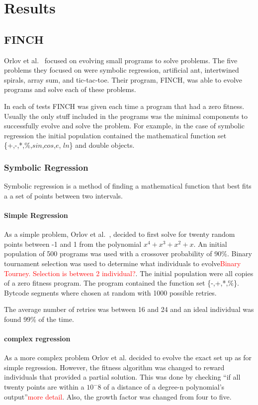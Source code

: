 \documentclass{sig-alternate}
\newcommand{\mycomment}[1]{\textcolor{red}{#1}}
\begin{document}
\section{Results}
\subsection{FINCH}
Orlov et al.~\cite{FINCH:2011} focused on evolving small programs to solve problems. The five problems they focused on were symbolic regression, artificial ant, intertwined spirals, array sum, and tic-tac-toe. Their program, FINCH, was able to evolve programs and solve each of these problems.

In each of tests FINCH was given each time a program that had a zero fitness. Usually the only stuff included in the programs was the minimal components to successfully evolve and solve the problem. For example, in the case of symbolic regression the initial population contained the mathematical function set \{+,-,*,\%,$sin$,$cos$,$e$, $ln$\} and double objects. 


\subsubsection{Symbolic Regression}
Symbolic regression is a method of finding a mathematical function that best fits a a set of points between two intervals.
\paragraph{Simple Regression}
	 As a simple problem, Orlov et al.~\cite{FINCH:2011}, decided to first solve for twenty random points between -1 and 1 from the polynomial \begin{math}x^4+x^3+x^2+x\end{math}. An initial population of 500 programs was used with a crossover probability of 90\%. Binary tournament selection was used to determine what individuals to evolve\mycomment{Binary Tourney. Selection is between 2 individual?}. The initial population were all copies of a zero fitness program. The program contained the function set \{-,+,*,\%\}. Bytcode segments where chosen at random with 1000 possible retries.
		
	The average number of retries was between 16 and 24 and an ideal individual was found 99\% of the time.

	
\paragraph{complex regression}		
	As a more complex problem Orlov et al. decided to evolve the exact set up as for simple regression. However, the fitness algorithm was changed to reward individuals that provided a partial solution. This was done by checking ``if all twenty points are within a \begin{math}10^-8\end{math} of a distance of a degree-n polynomial's output''\mycomment{more detail}. Also, the growth factor was changed from four to five.
	
\end{document}
